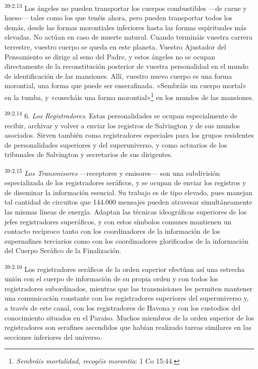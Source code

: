 \par
\textsuperscript{39:2.13} Los ángeles no pueden transportar los cuerpos combustibles ---de carne y hueso--- tales como los que tenéis ahora, pero pueden transportar todos los demás, desde las formas morontiales inferiores hasta las formas espirituales más elevadas. No actúan en caso de muerte natural. Cuando termináis vuestra carrera terrestre, vuestro cuerpo se queda en este planeta. Vuestro Ajustador del Pensamiento se dirige al seno del Padre, y estos ángeles no se ocupan directamente de la reconstitución posterior de vuestra personalidad en el mundo de identificación de las mansiones. Allí, vuestro nuevo cuerpo es una forma morontial, una forma que puede ser enserafinada. «Sembráis un cuerpo mortal» en la tumba, y «cosecháis una forma morontial»\footnote{\textit{Sembráis mortalidad, recogéis morontia}: 1 Co 15:44.} en los mundos de las mansiones.

\par
\textsuperscript{39:2.14} 6. \textit{Los Registradores}. Estas personalidades se ocupan especialmente de recibir, archivar y volver a enviar los registros de Salvington y de sus mundos asociados. Sirven también como registradores especiales para los grupos residentes de personalidades superiores y del superuniverso, y como actuarios de los tribunales de Salvington y secretarios de sus dirigentes.

\par
\textsuperscript{39:2.15} \textit{Los Transmisores} ---receptores y emisores--- son una subdivisión especializada de los registradores seráficos, y se ocupan de enviar los registros y de diseminar la información esencial. Su trabajo es de tipo elevado, pues manejan tal cantidad de circuitos que 144.000 mensajes pueden atravesar simultáneamente las mismas líneas de energía. Adaptan las técnicas ideográficas superiores de los jefes registradores superáficos, y con estos símbolos comunes mantienen un contacto recíproco tanto con los coordinadores de la información de los supernafines terciarios como con los coordinadores glorificados de la información del Cuerpo Seráfico de la Finalización.

\par
\textsuperscript{39:2.16} Los registradores seráficos de la orden superior efectúan así una estrecha unión con el cuerpo de información de su propia orden y con todos los registradores subordinados, mientras que las transmisiones les permiten mantener una comunicación constante con los registradores superiores del superuniverso y, a través de este canal, con los registradores de Havona y con los custodios del conocimiento situados en el Paraíso. Muchos miembros de la orden superior de los registradores son serafines ascendidos que habían realizado tareas similares en las secciones inferiores del universo.

